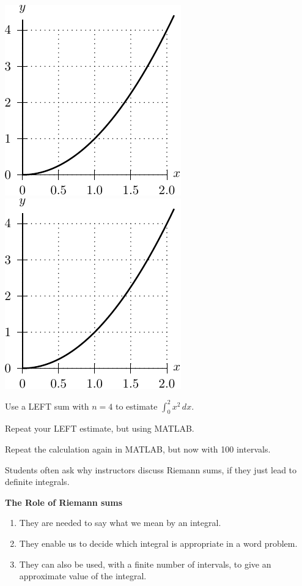 \includegraphics[width=0.3\linewidth]{graphics/notes_04_parabola_for_areas}
\hfill
\includegraphics[width=0.3\linewidth]{graphics/notes_04_parabola_for_areas}


\newpage
\problem Use a LEFT sum with $n=4$ to estimate
$\displaystyle \int_{0}^{2}x^2\,dx$.

\vfill
\vfill

Repeat your LEFT estimate, but using MATLAB.

\vfill Repeat the calculation again in MATLAB, but now with 100
intervals.

\vfill

\newpage
Students often ask why instructors discuss Riemann sums, if they just
lead to definite integrals.

\begin{boxnote}
{\bf The Role of Riemann sums}
\begin{enumerate}
\item They are needed to say what we mean by an integral. \\[2ex]
\item They enable us to decide which integral is appropriate in a word
problem. \\[2ex]
\item They can also be used, with a finite number of intervals, to
  give an approximate value of the integral. \\[1ex]
\end{enumerate}
\end{boxnote}

\vspace{0.5in}


